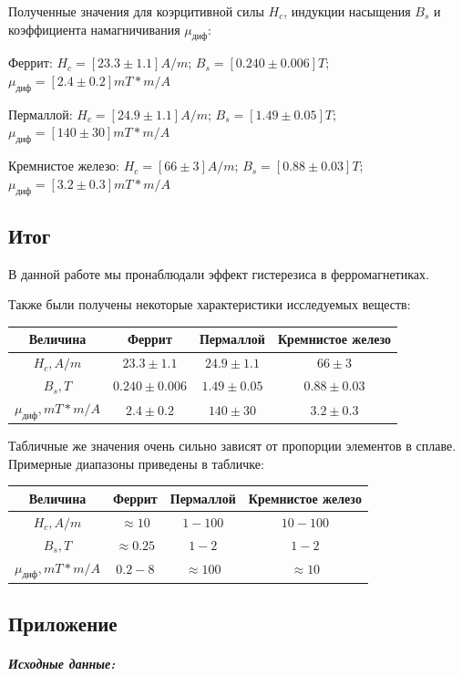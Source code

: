 \documentclass[a4paper,12pt]{article}
\begin{document}
Полученные значения для коэрцитивной силы $H_c$, индукции насыщения $B_s$ и коэффициента намагничивания $\mu_\text{диф}$:

Феррит: \hfill$H_c = [23.3 \pm 1.1]A/m$; $B_s = [0.240 \pm 0.006]T$; $\mu_\text{диф} = [2.4 \pm 0.2]mT*m/A$

Пермаллой: \hfill$H_c = [24.9 \pm 1.1]A/m$; $B_s = [1.49 \pm 0.05]T$; $\mu_\text{диф} = [140 \pm 30]mT*m/A$

Кремнистое железо: \hfill$H_c = [66 \pm 3]A/m$; $B_s = [0.88 \pm 0.03]T$; $\mu_\text{диф} = [3.2 \pm 0.3]mT*m/A$



\bigskip

\subsection*{Итог}
\bigskip

В данной работе мы пронаблюдали эффект гистерезиса в ферромагнетиках. 

Также были получены некоторые характеристики исследуемых веществ:
\medskip

\begin{tabular}{|c|c|c|c|}
\hline
Величина & Феррит & Пермаллой & Кремнистое железо \\ \hline
$H_c, A/m$ 			 & $23.3 \pm 1.1$  &  $24.9 \pm 1.1 $ & $66 \pm 3$  \\ \hline
$B_s, T$			 &$0.240 \pm 0.006$  &  $1.49 \pm 0.05 $ & $0.88 \pm 0.03 $     \\ \hline
$\mu_\text{диф}, mT*m/A$ &$2.4 \pm 0.2$ &   $140 \pm 30 $ & $3.2 \pm 0.3 $  \\ \hline
\end{tabular}

\medskip
Табличные же значения очень сильно зависят от пропорции элементов в сплаве. Примерные диапазоны приведены в табличке:
\medskip

\begin{tabular}{|c|c|c|c|}
\hline
Величина & Феррит & Пермаллой & Кремнистое железо \\ \hline
$H_c, A/m$ 			 & $\approx 10 $  &  $1 - 100 $ & $10 - 100$  \\ \hline
$B_s, T$			 &$\approx 0.25$  &  $1 - 2 $ & $1 - 2 $     \\ \hline
$\mu_\text{диф}, mT*m/A$ &$0.2 - 8$ &   $\approx 100$ & $\approx 10 $  \\ \hline
\end{tabular}
\bigskip

\subsection*{Приложение}
\bigskip
\subparagraph{Исходные данные:}
\end{document}
